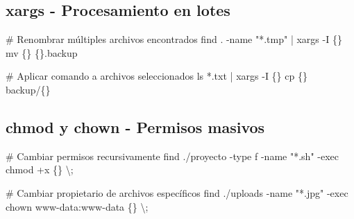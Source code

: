 \documentclass[
  11pt,
  letterpaper,
  oneside,
  openany]{scrbook}
\newenvironment{Shaded}{}{}
\newcommand{\AttributeTok}[1]{\textcolor[rgb]{0.84,0.23,0.29}{#1}}
\newcommand{\CommentTok}[1]{\textcolor[rgb]{0.42,0.45,0.49}{#1}}
\newcommand{\DataTypeTok}[1]{\textcolor[rgb]{0.84,0.23,0.29}{#1}}
\newcommand{\FunctionTok}[1]{\textcolor[rgb]{0.44,0.26,0.76}{#1}}
\newcommand{\KeywordTok}[1]{\textcolor[rgb]{0.84,0.23,0.29}{#1}}
\newcommand{\NormalTok}[1]{\textcolor[rgb]{0.14,0.16,0.18}{#1}}
\newcommand{\PreprocessorTok}[1]{\textcolor[rgb]{0.84,0.23,0.29}{#1}}
\newcommand{\StringTok}[1]{\textcolor[rgb]{0.01,0.18,0.38}{#1}}
\begin{document}
\begin{Shaded}
\end{Shaded}

\subsection{xargs - Procesamiento en
lotes}\label{xargs---procesamiento-en-lotes}

\begin{Shaded}
\begin{Highlighting}[]
\CommentTok{\# Renombrar múltiples archivos encontrados}
\FunctionTok{find}\NormalTok{ . }\AttributeTok{{-}name} \StringTok{"*.tmp"} \KeywordTok{|} \FunctionTok{xargs} \AttributeTok{{-}I}\NormalTok{ \{\} mv \{\} \{\}.backup}

\CommentTok{\# Aplicar comando a archivos seleccionados}
\FunctionTok{ls} \PreprocessorTok{*}\NormalTok{.txt }\KeywordTok{|} \FunctionTok{xargs} \AttributeTok{{-}I}\NormalTok{ \{\} cp \{\} backup/\{\}}
\end{Highlighting}
\end{Shaded}

\subsection{chmod y chown - Permisos
masivos}\label{chmod-y-chown---permisos-masivos}

\begin{Shaded}
\begin{Highlighting}[]
\CommentTok{\# Cambiar permisos recursivamente}
\FunctionTok{find}\NormalTok{ ./proyecto }\AttributeTok{{-}type}\NormalTok{ f }\AttributeTok{{-}name} \StringTok{"*.sh"} \AttributeTok{{-}exec}\NormalTok{ chmod +x \{\} }\DataTypeTok{\textbackslash{};}

\CommentTok{\# Cambiar propietario de archivos específicos}
\FunctionTok{find}\NormalTok{ ./uploads }\AttributeTok{{-}name} \StringTok{"*.jpg"} \AttributeTok{{-}exec}\NormalTok{ chown www{-}data:www{-}data \{\} }\DataTypeTok{\textbackslash{};}
\end{Highlighting}
\end{Shaded}
\end{document}
